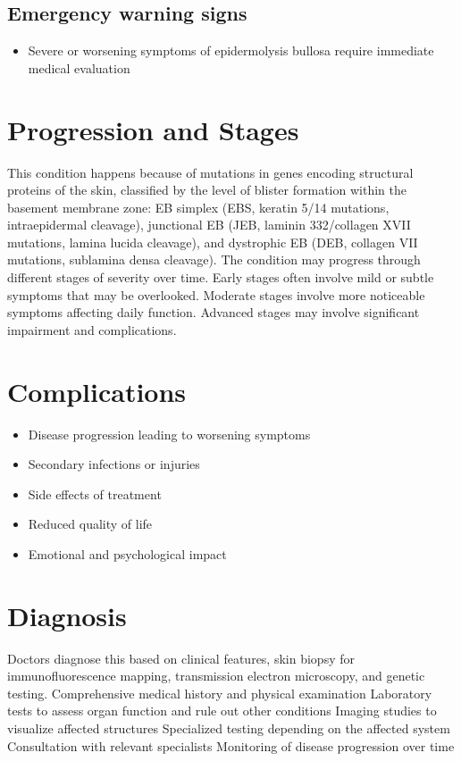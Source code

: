 \subsection{Emergency warning signs}
\begin{itemize}[noitemsep]
  \item Severe or worsening symptoms of epidermolysis bullosa require immediate medical evaluation
\end{itemize}
\section{Progression and Stages}
This condition happens because of mutations in genes encoding structural proteins of the skin, classified by the level of blister formation within the basement membrane zone: EB simplex (EBS, keratin 5/14 mutations, intraepidermal cleavage), junctional EB (JEB, laminin 332/collagen XVII mutations, lamina lucida cleavage), and dystrophic EB (DEB, collagen VII mutations, sublamina densa cleavage). The condition may progress through different stages of severity over time. Early stages often involve mild or subtle symptoms that may be overlooked. Moderate stages involve more noticeable symptoms affecting daily function. Advanced stages may involve significant impairment and complications.
\section{Complications}
\begin{itemize}[noitemsep]
  \item Disease progression leading to worsening symptoms
  \item Secondary infections or injuries
  \item Side effects of treatment
  \item Reduced quality of life
  \item Emotional and psychological impact
\end{itemize}
\section{Diagnosis}
Doctors diagnose this based on clinical features, skin biopsy for immunofluorescence mapping, transmission electron microscopy, and genetic testing. Comprehensive medical history and physical examination Laboratory tests to assess organ function and rule out other conditions Imaging studies to visualize affected structures Specialized testing depending on the affected system Consultation with relevant specialists Monitoring of disease progression over time

